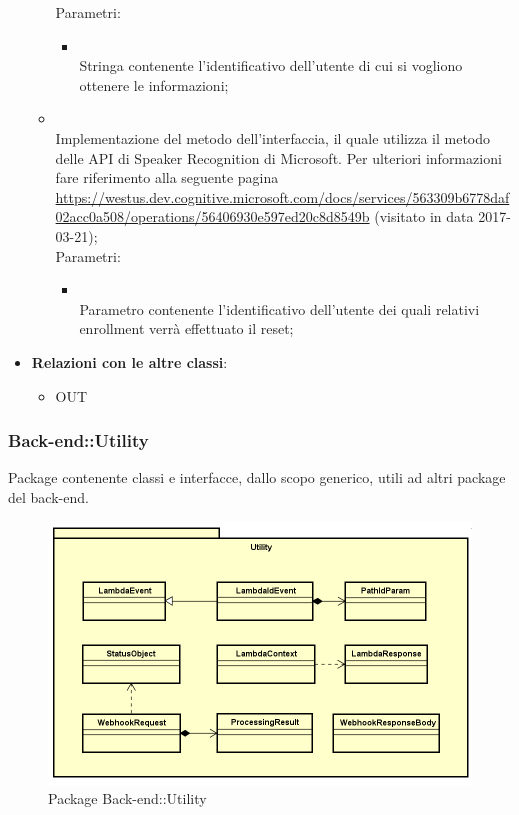 \begin{itemize}
\begin{itemize}
		Parametri:
		\begin{itemize}
			\item {} \\
			Stringa contenente l'identificativo dell'utente di cui si vogliono ottenere le informazioni;
		\end{itemize}
		\item[]  \\		Implementazione del metodo dell'interfaccia, il quale utilizza il metodo  delle API di Speaker Recognition di Microsoft. Per ulteriori informazioni fare riferimento alla seguente pagina \url{https://westus.dev.cognitive.microsoft.com/docs/services/563309b6778daf02acc0a508/operations/56406930e597ed20c8d8549b}  (visitato in data 2017-03-21);\\
		Parametri:
		\begin{itemize}
			\item {} \\
			Parametro contenente l'identificativo dell'utente dei quali relativi enrollment verrà effettuato il reset;
		\end{itemize}
	\end{itemize}
	\item \textbf{Relazioni con le altre classi}:
	\begin{itemize}
		\item OUT \hyperlink{VocalLoginModuleConfig_label}{}
	\end{itemize}
\end{itemize}
\FloatBarrier

\subsubsection{Back-end::Utility}
Package contenente classi e interfacce, dallo scopo generico, utili ad altri package del back-end.
\begin{figure}[h] \centering \includegraphics[width=\textwidth,height=\textheight,keepaspectratio]{images/diagrams/back-end/Official_Backend_0304/Utility.png}
	\caption{Package Back-end::Utility}
\end{figure}
